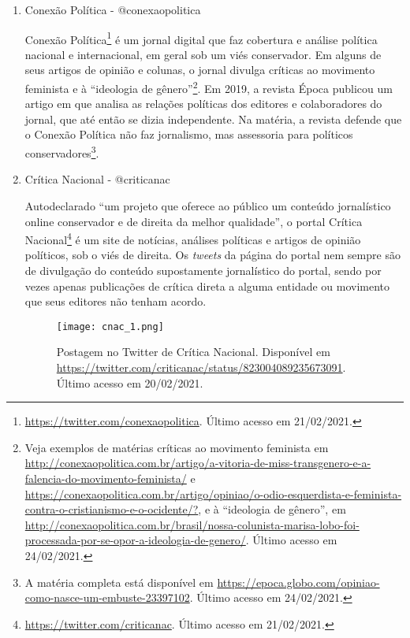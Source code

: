 \documentclass[
	12pt,				%
	openright,			%
	twoside,			%
	a4paper,			%
	english,			%
	brazil				%
	]{abntex2}
\begin{document}
\begin{anexosenv}
\begin{enumerate}
 \newpage
 
  \item Conexão Política - @conexaopolitica\label{conexpol}
  
  Conexão Política\footnote{\url{https://twitter.com/conexaopolitica}. Último acesso em 21/02/2021.} é um jornal digital que faz cobertura e análise política nacional e internacional, em geral sob um viés conservador. Em alguns de seus artigos de opinião e colunas, o jornal divulga críticas ao movimento feminista e à ``ideologia de gênero''\footnote{Veja exemplos de matérias críticas ao movimento feminista em \url{http://conexaopolitica.com.br/artigo/a-vitoria-de-miss-transgenero-e-a-falencia-do-movimento-feminista/} e \url{https://conexaopolitica.com.br/artigo/opiniao/o-odio-esquerdista-e-feminista-contra-o-cristianismo-e-o-ocidente/?}, e à ``ideologia de gênero'', em \url{http://conexaopolitica.com.br/brasil/nossa-colunista-marisa-lobo-foi-processada-por-se-opor-a-ideologia-de-genero/}. Último acesso em 24/02/2021.}. Em 2019, a revista Época publicou um artigo em que analisa as relações políticas dos editores e colaboradores do jornal, que até então se dizia independente. Na matéria, a revista defende que o Conexão Política não faz jornalismo, mas assessoria para políticos conservadores\footnote{A matéria completa está disponível em \url{https://epoca.globo.com/opiniao-como-nasce-um-embuste-23397102}. Último acesso em 24/02/2021.}.
  
 \item Crítica Nacional - @criticanac
 
 Autodeclarado ``um projeto que oferece ao público um conteúdo jornalístico online conservador e de direita da melhor qualidade'', o portal Crítica Nacional\footnote{\url{https://twitter.com/criticanac}. Último acesso em 21/02/2021.} é um site de notícias, análises políticas e artigos de opinião políticos, sob o viés de direita. Os \textit{tweets} da página do portal nem sempre são de divulgação do conteúdo supostamente jornalístico do portal, sendo por vezes apenas publicações de crítica direta a alguma entidade ou movimento que seus editores não tenham acordo.
 
 \begin{figure}[!htbp]
    \centering
    \texttt{[image: cnac\_1.png]}
    \caption{Postagem no Twitter de Crítica Nacional. Disponível em \url{https://twitter.com/criticanac/status/823004089235673091}. Último acesso em 20/02/2021.}
 \end{figure}
 

\end{enumerate}
\end{anexosenv}
\end{document}
